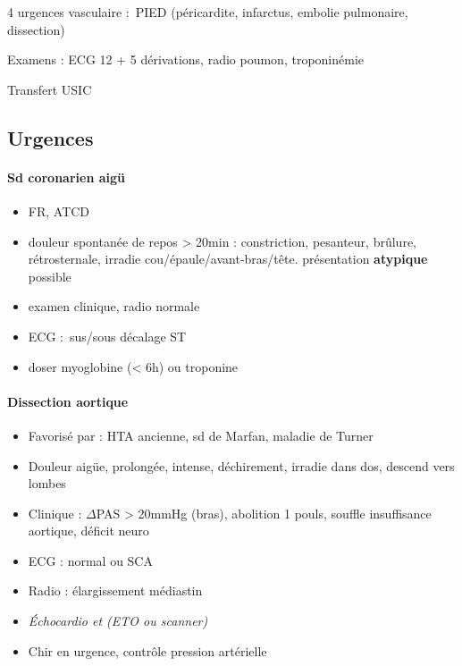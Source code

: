 4 urgences vasculaire : PIED (péricardite, infarctus, embolie pulmonaire,
dissection)

Examens : ECG 12 + 5 dérivations, radio poumon, troponinémie

Transfert USIC

\subsection{Urgences}

\paragraph{Sd coronarien aigü}
\begin{itemize}
  \item FR, ATCD
  \item douleur spontanée de repos > 20min : constriction, pesanteur, brûlure,
    rétrosternale, irradie  cou/épaule/avant-bras/tête. \danger présentation
    \textbf{atypique} possible
  \item examen clinique, radio normale
  \item ECG : sus/sous décalage ST
  \item doser myoglobine (< 6h) ou troponine
\end{itemize}

\paragraph{Dissection aortique}
\begin{itemize}
  \item Favorisé par : HTA ancienne, sd de Marfan, maladie de Turner
  \item Douleur aigüe, prolongée, intense, déchirement, irradie dans dos, descend
    vers lombes
  \item Clinique : $\Delta$PAS > 20mmHg (bras), abolition 1 pouls, souffle
    insuffisance aortique, déficit neuro
  \item ECG : normal ou SCA
  \item Radio : élargissement médiastin
  \item \textit{Échocardio et (ETO ou scanner)} 
  \item Chir en urgence, contrôle pression artérielle
\end{itemize}


